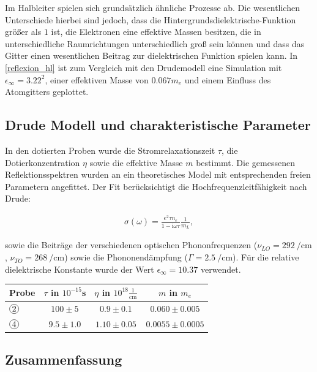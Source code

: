 \documentclass[paper=a4,fontsize=10pt,DIV=18,twocolumn,parskip=half]{scrartcl}
\numberwithin{equation}{section}    %
\begin{document}
Im Halbleiter spielen sich grundsätzlich ähnliche Prozesse ab. Die wesentlichen 
Unterschiede hierbei sind jedoch, dass die Hintergrundsdielektrische-Funktion 
größer als $1$ ist, die Elektronen eine effektive Massen besitzen, die in 
unterschiedliche Raumrichtungen unterschiedlich groß sein können und dass das 
Gitter einen wesentlichen Beitrag zur dielektrischen Funktion spielen kann. In 
\ref{reflexion_hl} ist zum Vergleich mit den Drudemodell eine Simulation mit 
$\epsilon_\infty=3.22^2$, einer effektiven Masse von $0.067m_e$ und einem 
Einfluss des Atomgitters geplottet.


\subsection{Drude Modell und charakteristische Parameter}

In den dotierten Proben wurde die Stromrelaxationszeit $\tau$, die 
Dotierkonzentration $\eta$ sowie die effektive Masse $m$ bestimmt. Die 
gemessenen Reflektionsspektren wurden an ein theoretisches Model mit 
entsprechenden freien Parametern angefittet. Der Fit berücksichtigt die 
Hochfrequenzleitfähigkeit nach Drude:

\begin{align}
    \sigma(\omega) = \frac{e^2 \tau n_e}{1-\text{i}\omega\tau} 
    \frac{1}{m_L},
\end{align}

sowie die Beiträge der verschiedenen optischen Phononfrequenzen 
($\nu_{LO}=\SI{292}{\per\centi\meter}$, $\nu_{TO}=\SI{268}{\per\centi\meter}$) 
sowie die Phononendämpfung ($\Gamma=\SI{2.5}{\per\centi\meter}$). Für die 
relative dielektrische Konstante wurde der Wert $\epsilon_{\infty}=10.37$ 
verwendet.

\begin{tabular}{l c c c}
    Probe & $\tau$ in $10^{-15}$s & $\eta$ in $10^{18} \frac{1}{\text{cm}}$ &
   $m$ in $m_e$ \\
   \hline
   $\circled{2}$ & $100\pm5$ & $0.9\pm0.1$ & $0.060\pm0.005$ \\
   $\circled{4}$ & $9.5\pm1.0$ & $1.10\pm0.05$ & $0.0055\pm0.0005$
\end{tabular}





\subsection{Zusammenfassung}
\end{document}
